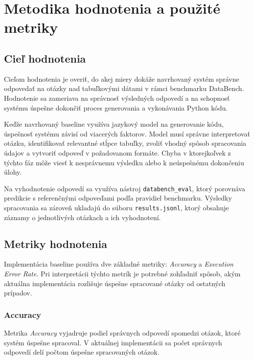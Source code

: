 \section{Metodika hodnotenia a použité metriky}
\label{sec:metodika-hodnotenia}

\subsection{Cieľ hodnotenia}

Cieľom hodnotenia je overiť, do akej miery dokáže navrhovaný systém správne odpovedať na otázky nad tabuľkovými dátami v rámci benchmarku DataBench. Hodnotenie sa zameriava na správnosť výsledných odpovedí a na schopnosť systému úspešne dokončiť proces generovania a vykonávania Python kódu.

Keďže navrhovaný baseline využíva jazykový model na generovanie kódu, úspešnosť systému závisí od viacerých faktorov. Model musí správne interpretovať otázku, identifikovať relevantné stĺpce tabuľky, zvoliť vhodný spôsob spracovania údajov a vytvoriť odpoveď v požadovanom formáte. Chyba v ktorejkoľvek z týchto fáz môže viesť k nesprávnemu výsledku alebo k neúspešnému dokončeniu úlohy.

Na vyhodnotenie odpovedí sa využíva nástroj
\texttt{databench\_eval}, ktorý porovnáva predikcie s referenčnými odpoveďami podľa pravidiel benchmarku. Výsledky spracovania sa zároveň ukladajú do súboru \texttt{results.jsonl}, ktorý obsahuje záznamy o jednotlivých otázkach a ich vyhodnotení.

\subsection{Metriky hodnotenia}

Implementácia baseline používa dve základné metriky: \textit{Accuracy} a \textit{Execution Error Rate}. Pri interpretácii týchto metrík je potrebné zohľadniť spôsob, akým aktuálna implementácia rozlišuje úspešne spracované otázky od ostatných prípadov.

\subsubsection{Accuracy}

Metrika \textit{Accuracy} vyjadruje podiel správnych odpovedí spomedzi otázok, ktoré systém úspešne spracoval. V aktuálnej implementácii sa počet správnych odpovedí delí počtom úspešne spracovaných otázok.

